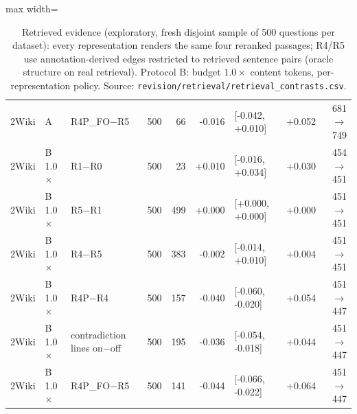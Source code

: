 \begin{table}[t]
\begin{adjustbox}{max width=\linewidth}
\begin{tabular}{@{}lllrrrlrr@{}}
2Wiki & A & R4P\_FO$-$R5 & 500 & 66 & -0.016 & [-0.042, +0.010] & +0.052 & 681$\to$749 \\
2Wiki & B 1.0$\times$ & R1$-$R0 & 500 & 23 & +0.010 & [-0.016, +0.034] & +0.030 & 454$\to$451 \\
2Wiki & B 1.0$\times$ & R5$-$R1 & 500 & 499 & +0.000 & [+0.000, +0.000] & +0.000 & 451$\to$451 \\
2Wiki & B 1.0$\times$ & R4$-$R5 & 500 & 383 & -0.002 & [-0.014, +0.010] & +0.004 & 451$\to$451 \\
2Wiki & B 1.0$\times$ & R4P$-$R4 & 500 & 157 & -0.040 & [-0.060, -0.020] & +0.054 & 451$\to$447 \\
2Wiki & B 1.0$\times$ & contradiction lines on$-$off & 500 & 195 & -0.036 & [-0.054, -0.018] & +0.044 & 451$\to$447 \\
2Wiki & B 1.0$\times$ & R4P\_FO$-$R5 & 500 & 141 & -0.044 & [-0.066, -0.022] & +0.064 & 451$\to$447 \\
\bottomrule
\end{tabular}
\end{adjustbox}
\caption{Retrieved evidence (exploratory, fresh disjoint sample of 500 questions per dataset): every representation renders the same four reranked passages; R4/R5 use annotation-derived edges restricted to retrieved sentence pairs (oracle structure on real retrieval). Protocol B: budget $1.0\times$ content tokens, per-representation policy. Source: \texttt{revision/\allowbreak retrieval/\allowbreak retrieval\_contrasts.csv}.}
\label{tab:retrieval}
\end{table}
